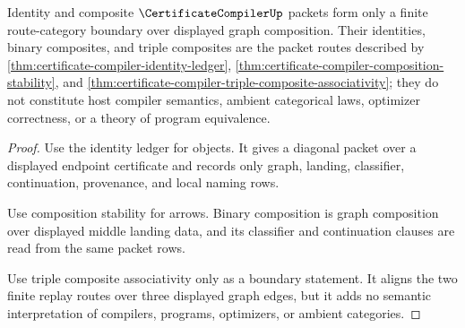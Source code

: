 \begin{theorem}
\label{thm:certificate-compiler-route-category-boundary}
Identity and composite $\CertificateCompilerUp$ packets form only a finite route-category boundary over displayed graph composition. Their identities, binary composites, and triple composites are the packet routes described by \autoref{thm:certificate-compiler-identity-ledger}, \autoref{thm:certificate-compiler-composition-stability}, and \autoref{thm:certificate-compiler-triple-composite-associativity}; they do not constitute host compiler semantics, ambient categorical laws, optimizer correctness, or a theory of program equivalence.
\end{theorem}
\begin{proof}
Use the identity ledger for objects. It gives a diagonal packet over a displayed endpoint certificate and records only graph, landing, classifier, continuation, provenance, and local naming rows.

Use composition stability for arrows. Binary composition is graph composition over displayed middle landing data, and its classifier and continuation clauses are read from the same packet rows.

Use triple composite associativity only as a boundary statement. It aligns the two finite replay routes over three displayed graph edges, but it adds no semantic interpretation of compilers, programs, optimizers, or ambient categories.
\end{proof}

